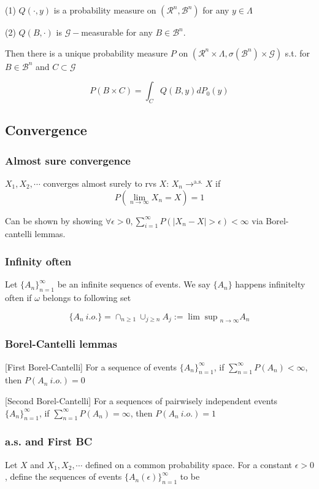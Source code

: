 (1) $Q(\cdot, y)$ is a probability measure on $(\mathcal{R}^n, \mathcal{B}^n)$ for any $y\in\Lambda$

(2) $Q(B, \cdot)$ is $\mathcal{G}-$measurable for any $B\in\mathcal{B}^n$.

Then there is a unique probability measure $P$ on $(\mathcal{R}^n\times\Lambda, \sigma(\mathcal{B}^n)\times\mathcal{G})$ s.t. for $B\in\mathcal{B}^n$ and $C\subset\mathcal{G}$

$$
P(B\times C) = \int_C Q(B, y) dP_0(y)
$$

\subsection{Convergence}

\subsubsection{Almost sure convergence} $X_1, X_2, \cdots$ converges almost surely to rvs $X$: $X_n\rightarrow^{\text{a.s.}}X$ if
$$
P\left(\lim_{n\rightarrow\infty} X_n = X\right) = 1
$$

Can be shown by showing $\forall \epsilon > 0, \sum_{i=1}^\infty P(|X_n - X| > \epsilon) < \infty$ via Borel-cantelli lemmas.

\subsubsection{Infinity often} Let $\{A_n\}_{n=1}^\infty$ be an infinite sequencs of events. We say $\{A_n\}$ happens infinitelty often if $\omega$ belongs to following set

$$
\{A_n~i.o.\} = \cap_{n\geq1}\cup_{j\geq n} A_j := {\lim\sup}_{n\rightarrow\infty} A_n
$$

\subsubsection{Borel-Cantelli lemmas}

[First Borel-Cantelli] For a sequence of events $\{A_n\}_{n=1}^\infty$, if $\sum_{n=1}^\infty P(A_n) < \infty$, then $P(A_n ~i.o.)=0$

[Second Borel-Cantelli] For a sequences of pairwisely independent events $\{A_n\}_{n=1}^\infty$, if $\sum_{n=1}^\infty P(A_n)=\infty$, then $P(A_n~i.o.)=1$

\subsubsection{a.s. and First BC} Let $X$ and $X_1, X_2, \cdots$ defined on a common probability space. For a constant $\epsilon > 0$, define the sequences of events $\{A_n(\epsilon)\}_{n=1}^\infty$ to be

